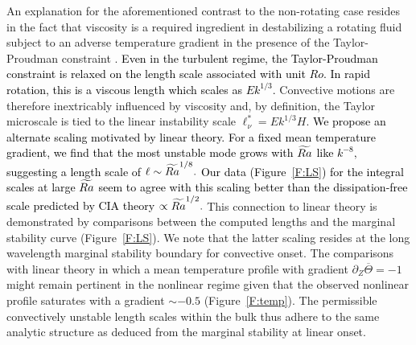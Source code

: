 An explanation for the aforementioned contrast to the non-rotating case resides in the fact that viscosity is a required ingredient in destabilizing a rotating fluid subject to an adverse temperature gradient in the presence of the Taylor-Proudman constraint  \citep{sC61}. 
\textcolor{black}{Even in the turbulent regime, the Taylor-Proudman constraint is relaxed on the length scale associated with unit $Ro$. In rapid rotation, this is a viscous length which scales as $ Ek^{1/3} $.}
Convective motions are therefore inextricably influenced by viscosity and, by definition, the Taylor microscale is tied to the linear instability scale $\ell^*_\nu= Ek^{1/3}H$. 
\textcolor{black}{We propose an alternate scaling motivated by linear theory.
For a fixed mean temperature gradient, we find that the most unstable mode grows with $\widetilde{Ra}$ like $k^{-8},$ suggesting a length scale of $\ell\sim\widetilde{Ra}^{1/8}.$
Our data (Figure~\ref{F:LS}) for the integral scales at large $\widetilde{Ra}$ seem to agree with this scaling better than the dissipation-free scale predicted by CIA theory  $\propto \widetilde{Ra}^{1/2}.$}
This connection to linear theory is demonstrated by comparisons between the computed lengths and the marginal stability curve (Figure~\ref{F:LS}). 
We note that the latter scaling resides at the long wavelength marginal stability boundary for convective onset. The comparisons with linear theory in which a mean temperature profile with gradient $\partial_Z \overline{\Theta} = -1$ might remain pertinent in the nonlinear regime given that the observed nonlinear profile saturates with a gradient $\sim -0.5$ (Figure~\ref{F:temp}). The permissible convectively unstable length scales within the bulk thus adhere to the same analytic structure as deduced from the marginal stability at linear onset.


